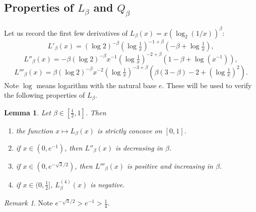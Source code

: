 \documentclass[12pt]{amsart}
\theoremstyle{plain}
\newtheorem{lem}[thm]{Lemma}
\theoremstyle{definition}
\theoremstyle{remark}
\newtheorem{rem}[thm]{Remark}
\numberwithin{equation}{section}
\begin{document}
\subsection{\texorpdfstring{Properties of $L_\beta$ and $Q_\beta$}{Properties of L and Q}}\label{sec:LandQprop}
Let us record the first few derivatives of $L_\beta(x)=x (\log_2(1/x))^\beta$:
\begin{equation}\label{eqn:DL}
L'_\beta(x) = (\log 2)^{-\beta} (\log \tfrac1x)^{-1+\beta} (-\beta +\log \tfrac1x),
\end{equation}
\begin{equation}\label{eqn:DDL}
L''_\beta(x) = -\beta (\log 2)^{-\beta} x^{-1} (\log \tfrac1x)^{-2+\beta}(1-\beta+\log(x^{-1})),
\end{equation}
\begin{equation}\label{eqn:DDDL}
L'''_\beta(x) = \beta (\log 2)^{-\beta} x^{-2} (\log\tfrac1x)^{-3+\beta} (\beta(3-\beta)-2 + (\log\tfrac1x)^2).
\end{equation}
Note $\log$ means logarithm with the natural base $e$.
These will be used to verify the following properties of $L_\beta$.
\begin{lem}\label{lem:Lprop}
Let $\beta\in [\frac12,1]$.
Then
\begin{enumerate}
\item the function $x\mapsto L_\beta(x)$ is strictly concave on $[0,1]$.
\item if $x\in (0,e^{-1})$, then $L''_\beta(x)$ is decreasing in $\beta$.
\item if $x\in (0,e^{-\sqrt{3}/2})$, then $L'''_\beta(x)$ is positive and increasing in $\beta$.
\item if $x\in (0,\tfrac{1}{2}]$,  $L^{(4)}_\beta(x)$ is negative. 
\end{enumerate}
\end{lem}
\begin{rem}
Note $e^{-\sqrt{3}/2}>e^{-1}>\frac14$. \end{rem}
\end{document}
